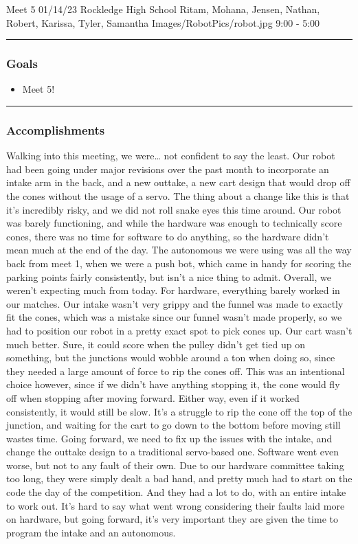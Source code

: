         \insertmeeting 
	{Meet 5} 
	{01/14/23} 
	{Rockledge High School}
	{Ritam, Mohana, Jensen, Nathan, Robert, Karissa, Tyler, Samantha}
	{Images/RobotPics/robot.jpg}
	{9:00 - 5:00}
	
\noindent\hfil\rule{\textwidth}{.4pt}\hfil
\subsubsection*{Goals}
\begin{itemize}
    \item Meet 5!

\end{itemize} 

\noindent\hfil\rule{\textwidth}{.4pt}\hfil

\subsubsection*{Accomplishments}
Walking into this meeting, we were… not confident to say the least. Our robot had been going under major revisions over the past month to incorporate an intake arm in the back, and a new outtake, a new cart design that would drop off the cones without the usage of a servo. The thing about a change like this is that it’s incredibly risky, and we did not roll snake eyes this time around. Our robot was barely functioning, and while the hardware was enough to technically score cones, there was no time for software to do anything, so the hardware didn’t mean much at the end of the day. The autonomous we were using was all the way back from meet 1, when we were a push bot, which came in handy for scoring the parking points fairly consistently, but isn’t a nice thing to admit. Overall, we weren’t expecting much from today.
For hardware, everything barely worked in our matches. Our intake wasn’t very grippy and the funnel was made to exactly fit the cones, which was a mistake since our funnel wasn’t made properly, so we had to position our robot in a pretty exact spot to pick cones up. Our cart wasn’t much better. Sure, it could score when the pulley didn’t get tied up on something, but the junctions would wobble around a ton when doing so, since they needed a large amount of force to rip the cones off. This was an intentional choice however, since if we didn’t have anything stopping it, the cone would fly off when stopping after moving forward. Either way, even if it worked consistently, it would still be slow. It’s a struggle to rip the cone off the top of the junction, and waiting for the cart to go down to the bottom before moving still wastes time. Going forward, we need to fix up the issues with the intake, and change the outtake design to a traditional servo-based one.
Software went even worse, but not to any fault of their own. Due to our hardware committee taking too long, they were simply dealt a bad hand, and pretty much had to start on the code the day of the competition. And they had a lot to do, with an entire intake to work out. It’s hard to say what went wrong considering their faults laid more on hardware, but going forward, it’s very important they are given the time to program the intake and an autonomous.

